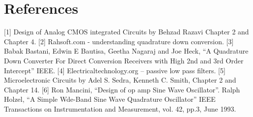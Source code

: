 \documentclass[conference]{IEEEtran}
\begin{document}
\section{References}

[1] Design of Analog CMOS integrated Circuits by Behzad 
Razavi Chapter 2 and Chapter 4.  
[2] Rahsoft.com - understanding quadrature down conversion.  
[3] Babak Bastani, Edwin E Bautisa, Geetha Nagaraj and Joe 
Heck, “A Quadrature Down Converter For Direct Conversion 
Receivers with High 2nd and 3rd Order Intercept” IEEE.  
[4] Electricaltechnology.org – passive low pass filters.  
[5] Microelectronic Circuits by Adel S. Sedra, Kenneth C. 
Smith, Chapter 2 and Chapter 14.  
[6] Ron Mancini, “Design of op amp Sine Wave Oscillator”. 
Ralph Holzel, “A Simple Wde-Band Sine Wave Quadrature 
Oscillator” IEEE Transactions on Instrumentation and 
Measurement, vol. 42, pp.3, June 1993.
\end{document}
